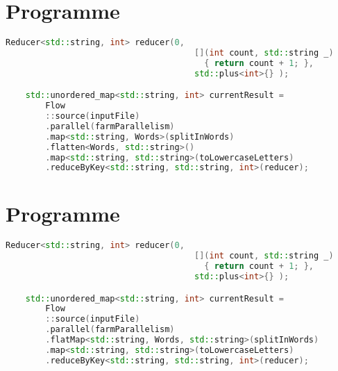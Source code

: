 \newpage
\section{Programme }
\label{appendice-code-wordcount-s.ann}
\begin{lstlisting}[gobble=4,basicstyle=\ttfamily\footnotesize,language=c++]
    Reducer<std::string, int> reducer(0, 
                                      [](int count, std::string _)
                                        { return count + 1; },
                                      std::plus<int>{} );

    std::unordered_map<std::string, int> currentResult = 
        Flow
        ::source(inputFile)
        .parallel(farmParallelism)
        .map<std::string, Words>(splitInWords)			
        .flatten<Words, std::string>()			
        .map<std::string, std::string>(toLowercaseLetters)			
        .reduceByKey<std::string, std::string, int>(reducer);  
\end{lstlisting}

\newpage
\section{Programme }
\begin{lstlisting}[gobble=4,basicstyle=\ttfamily\footnotesize,language=c++]
    Reducer<std::string, int> reducer(0, 
                                      [](int count, std::string _)
                                        { return count + 1; },
                                      std::plus<int>{} );

    std::unordered_map<std::string, int> currentResult = 
        Flow
        ::source(inputFile)
        .parallel(farmParallelism)
        .flatMap<std::string, Words, std::string>(splitInWords)			
        .map<std::string, std::string>(toLowercaseLetters)			
        .reduceByKey<std::string, std::string, int>(reducer);  
\end{lstlisting}

\newpage
